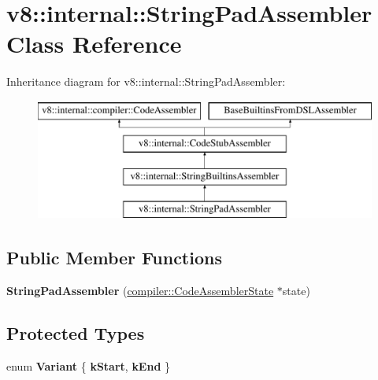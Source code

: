 \hypertarget{classv8_1_1internal_1_1StringPadAssembler}{}\section{v8\+:\+:internal\+:\+:String\+Pad\+Assembler Class Reference}
\label{classv8_1_1internal_1_1StringPadAssembler}
Inheritance diagram for v8\+:\+:internal\+:\+:String\+Pad\+Assembler\+:\begin{figure}[H]
\begin{center}
\leavevmode
\includegraphics[height=4.000000cm]{classv8_1_1internal_1_1StringPadAssembler}
\end{center}
\end{figure}
\subsection*{Public Member Functions}
\begin{DoxyCompactItemize}
\item 
\mbox{\label{classv8_1_1internal_1_1StringPadAssembler_a017f1d80483ddef06aa0da1c85fb28ba}} 
{\bfseries String\+Pad\+Assembler} (\mbox{\hyperlink{classv8_1_1internal_1_1compiler_1_1CodeAssemblerState}{compiler\+::\+Code\+Assembler\+State}} $\ast$state)
\end{DoxyCompactItemize}
\subsection*{Protected Types}
\begin{DoxyCompactItemize}
\item 
\mbox{\label{classv8_1_1internal_1_1StringPadAssembler_ac58b231123d9c4fa37c2d8f4f7b62b28}} 
enum {\bfseries Variant} \{ {\bfseries k\+Start}, 
{\bfseries k\+End}
 \}
\end{DoxyCompactItemize}
